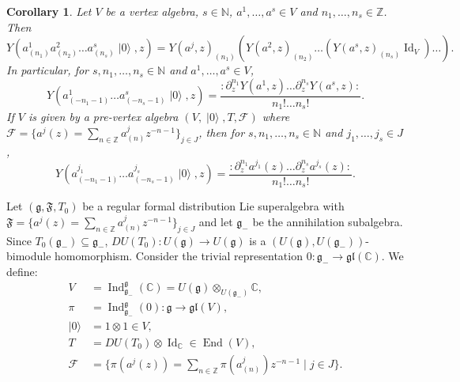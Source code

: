 \documentclass[a4paper, 12pt, reqno]{amsart}
\newtheorem{corollary}[theorem]{Corollary}
\theoremstyle{remark}
\numberwithin{equation}{subsection}
\DeclareMathOperator{\Id}{Id}
\DeclareMathOperator{\End}{End}
\DeclareMathOperator{\Ind}{Ind}
\DeclareMathOperator{\vac}{|0\rangle}
\begin{document}
\begin{corollary}
  \label{crl:1}
  Let $V$ be a vertex algebra, $s \in \mathbb{N}$, $a^1, \dots, a^s \in V$ and $n_1, \dots, n_s \in \mathbb{Z}$.
  Then 
  \begin{equation*}
    Y(a^1_{(n_1)}a^2_{(n_2)}\dots a^s_{(n_s)}\vac, z) = Y(a^j, z)_{(n_1)}(Y(a^2, z)_{(n_2)}\dots (Y(a^s, z)_{(n_s)}\Id_V)\dots).
  \end{equation*}
  In particular, for $s, n_1, \dots, n_s \in \mathbb{N}$ and $a^1, \dots, a^s \in V$,
  \begin{equation}
    \label{eq:18}
    Y(a^1_{(-n_1 - 1)}\dots a^s_{(-n_s - 1)}\vac, z) = \frac{:\partial^{n_1}_zY(a^1,z)\dots \partial^{n_s}_zY(a^s,z):}{n_1!\dots n_s!}.
  \end{equation}
  If $V$ is given by a pre-vertex algebra $(V, \vac, T, \mathcal{F})$ where $\mathcal{F} = \{a^j(z) = \sum_{n \in \mathbb{Z}}a^j_{(n)}z^{-n - 1}\}_{j \in J}$, then for $s, n_1, \dots, n_s \in \mathbb{N}$ and $j_1, \dots, j_s \in J$,
  \begin{equation}
    \label{eq:19}
    Y(a^{j_1}_{(-n_1 - 1)}\dots a^{j_s}_{(-n_s - 1)}\vac, z) = \frac{:\partial^{n_1}_za^{j_1}(z)\dots \partial^{n_s}_za^{j_s}(z):}{n_1!\dots n_s!}.
  \end{equation}
\end{corollary}

Let $(\mathfrak{g}, \mathfrak{F}, T_0)$ be a regular formal distribution Lie superalgebra with $\mathfrak{F} = \{a^j(z) = \sum_{n \in \mathbb{Z}}a^j_{(n)}z^{-n - 1}\}_{j \in J}$ and let $\mathfrak{g}_-$ be the annihilation subalgebra.
Since $T_0(\mathfrak{g}_-) \subseteq \mathfrak{g}_-$, $DU(T_0): U(\mathfrak{g}) \to U(\mathfrak{g})$ is a $(U(\mathfrak{g}), U(\mathfrak{g}_-))$-bimodule homomorphism.
Consider the trivial representation $0: \mathfrak{g}_- \to \mathfrak{gl}(\mathbb{C})$.
We define:
\begin{align*}
  V &= \Ind^{\mathfrak{g}}_{\mathfrak{g}_-}(\mathbb{C}) = U(\mathfrak{g}) \otimes_{U(\mathfrak{g}_-)} \mathbb{C}, \\
  \pi &= \Ind^{\mathfrak{g}}_{\mathfrak{g}_-}(0): \mathfrak{g} \to \mathfrak{gl}(V), \\
  \vac &= 1\otimes1 \in V, \\
  T &= DU(T_0) \otimes \Id_{\mathbb{C}} \in \End(V), \\
  \mathcal{F} &= \{\pi(a^j(z)) = \sum_{n \in \mathbb{Z}}\pi(a^j_{(n)})z^{-n - 1} \mid j \in J\}.
\end{align*}
\end{document}
